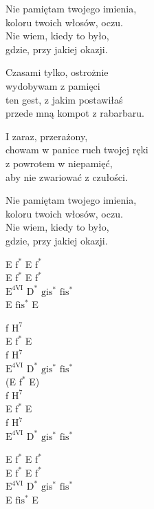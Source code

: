 \begin{textn}
    Nie pamiętam twojego imienia,\\
    koloru twoich włosów, oczu.\\
    Nie wiem, kiedy to było,\\
    gdzie, przy jakiej okazji.

    Czasami tylko, ostrożnie\\
    wydobywam z pamięci\\
    ten gest, z jakim postawiłaś\\
    przede mną kompot z rabarbaru.

    I zaraz, przerażony,\\
    chowam w panice ruch twojej ręki\\
    z powrotem w niepamięć,\\
    aby nie zwariować z czułości.

    Nie pamiętam twojego imienia,\\
    koloru twoich włosów, oczu.\\
    Nie wiem, kiedy to było,\\
    gdzie, przy jakiej okazji.
\end{textn}
\begin{chordw}
    E $\mathrm{f^{*}}$ E $\mathrm{f^{*}}$\\
    E $\mathrm{f^{*}}$ E $\mathrm{f^{*}}$\\
    $\mathrm{E^{4VI}}$ $\mathrm{D^{*}}$ $\mathrm{gis^{*}}$ $\mathrm{fis^{*}}$\\
    E $\mathrm{fis^{*}}$ E

    f $\mathrm{H^{7}}$\\
    E $\mathrm{f^{*}}$ E\\
    f $\mathrm{H^{7}}$\\
    $\mathrm{E^{4VI}}$ $\mathrm{D^{*}}$ $\mathrm{gis^{*}}$ $\mathrm{fis^{*}}$\\
    (E $\mathrm{f^{*}}$ E)\\
    f $\mathrm{H^{7}}$\\
    E $\mathrm{f^{*}}$ E\\
    f $\mathrm{H^{7}}$\\
    $\mathrm{E^{4VI}}$ $\mathrm{D^{*}}$ $\mathrm{gis^{*}}$ $\mathrm{fis^{*}}$

    E $\mathrm{f^{*}}$ E $\mathrm{f^{*}}$\\
    E $\mathrm{f^{*}}$ E $\mathrm{f^{*}}$\\
    $\mathrm{E^{4VI}}$ $\mathrm{D^{*}}$ $\mathrm{gis^{*}}$ $\mathrm{fis^{*}}$\\
    E $\mathrm{fis^{*}}$ E
\end{chordw}

